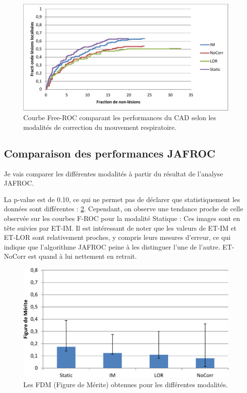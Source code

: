\begin{figure}[h!]
 \begin{center}
   \includegraphics[width=13cm]{images/FROC_mod}
 \end{center}
 \caption{ \label{lab:froc_mod} Courbe Free-ROC comparant les performances du CAD selon les modalités de correction du mouvement respiratoire.}
\end{figure}


\subsection{Comparaison des performances JAFROC}

Je vais comparer les différentes modalités à partir du résultat de l'analyse JAFROC.

La p-value est de 0.10, ce qui ne permet pas de déclarer que statistiquement les données sont différentes : \ref{lab:fom_mod}. Cependant, on observe une tendance proche de celle observée sur les courbes F-ROC pour la modalité Statique : Ces images sont en tête suivies par ET-IM. Il est intéressant de noter que les valeurs de ET-IM et ET-LOR sont relativement proches, y compris leurs mesures d'erreur, ce qui indique que l'algorithme JAFROC peine à les distinguer l'une de l'autre. ET-NoCorr est quand à lui nettement en retrait. 

\begin{figure}[h!]
 \begin{center}
   \includegraphics[width=13cm]{images/FOM_mod}
 \end{center}
 \caption{ \label{lab:fom_mod} Les FDM (Figure de Mérite) obtenues pour les différentes modalités.}
\end{figure}

